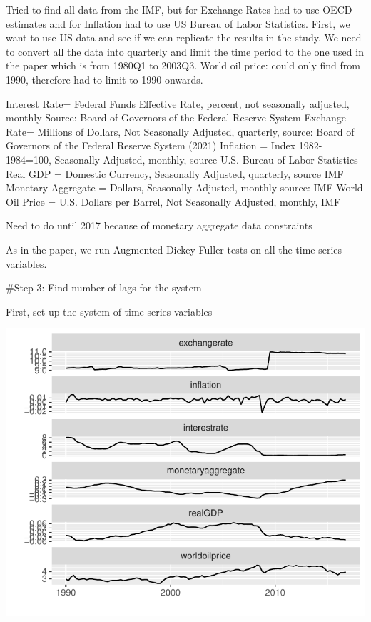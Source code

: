 \documentclass[11pt,preprint, authoryear]{elsarticle}
\numberwithin{equation}{section}
\numberwithin{figure}{section}
\numberwithin{table}{section}
\begin{document}
Tried to find all data from the IMF, but for Exchange Rates had to use
OECD estimates and for Inflation had to use US Bureau of Labor
Statistics. First, we want to use US data and see if we can replicate
the results in the study. We need to convert all the data into quarterly
and limit the time period to the one used in the paper which is from
1980Q1 to 2003Q3. World oil price: could only find from 1990, therefore
had to limit to 1990 onwards.

Interest Rate= Federal Funds Effective Rate, percent, not seasonally
adjusted, monthly Source: Board of Governors of the Federal Reserve
System Exchange Rate= Millions of Dollars, Not Seasonally Adjusted,
quarterly, source: Board of Governors of the Federal Reserve System
(2021) Inflation = Index 1982-1984=100, Seasonally Adjusted, monthly,
source U.S. Bureau of Labor Statistics Real GDP = Domestic Currency,
Seasonally Adjusted, quarterly, source IMF Monetary Aggregate = Dollars,
Seasonally Adjusted, monthly source: IMF World Oil Price = U.S. Dollars
per Barrel, Not Seasonally Adjusted, monthly, IMF

Need to do until 2017 because of monetary aggregate data constraints

As in the paper, we run Augmented Dickey Fuller tests on all the time
series variables.

\#Step 3: Find number of lags for the system

First, set up the system of time series variables

\begin{center}\includegraphics{README_files/figure-latex/unnamed-chunk-1-1} \end{center}
\end{document}
